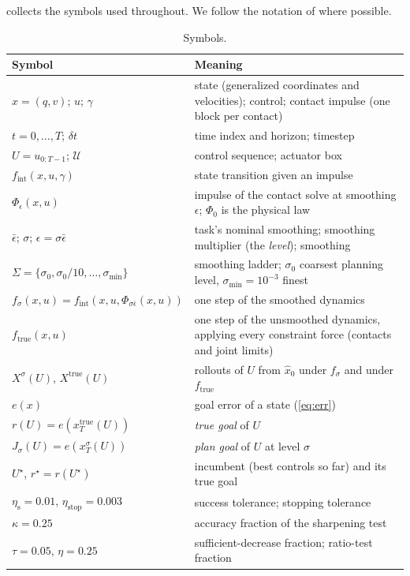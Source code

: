 \documentclass[11pt]{article}
\theoremstyle{remark}
\newcommand{\ftrue}{f_{\mathrm{true}}}
\newcommand{\fint}{f_{\mathrm{int}}}
\newcommand{\epsref}{\bar{\epsilon}}
\newcommand{\etas}{\eta_{\mathrm{s}}}
\newcommand{\etastop}{\eta_{\mathrm{stop}}}
\newcommand{\smin}{\sigma_{\min}}
\newcommand{\U}{\mathcal{U}}
\newcommand{\inc}{U^\star}
\newcommand{\rinc}{r^\star}
\begin{document}
 collects the symbols used throughout. We follow the notation of \cite{li2027lifted} where possible.

\begin{table}[t]
\centering
\caption{Symbols.}
\label{tab:symbols}
\small
\begin{tabularx}{\linewidth}{@{}lX@{}}
\toprule
Symbol & Meaning \\
\midrule
$x = (q, v)$; $u$; $\gamma$ & state (generalized coordinates and velocities); control; contact impulse (one block per contact) \\
$t = 0, \dots, T$; $\delta t$ & time index and horizon; timestep \\
$U = u_{0:T-1}$; $\U$ & control sequence; actuator box \\
$\fint(x, u, \gamma)$ & state transition given an impulse \\
$\Phi_\epsilon(x, u)$ & impulse of the contact solve at smoothing $\epsilon$; $\Phi_0$ is the physical law \\
$\epsref$; $\sigma$; $\epsilon = \sigma\epsref$ & task's nominal smoothing; smoothing multiplier (the \emph{level}); smoothing \\
$\Sigma = \{\sigma_0, \sigma_0/10, \dots, \smin\}$ & smoothing ladder; $\sigma_0$ coarsest planning level, $\smin = 10^{-3}$ finest \\
$f_\sigma(x,u) = \fint(x,u,\Phi_{\sigma\epsref}(x,u))$ & one step of the smoothed dynamics \\
$\ftrue(x, u)$ & one step of the unsmoothed dynamics, applying every constraint force (contacts and joint limits) \\
$X^\sigma(U)$, $X^{\mathrm{true}}(U)$ & rollouts of $U$ from $\hat x_0$ under $f_\sigma$ and under $\ftrue$ \\
$e(x)$ & goal error of a state (\cref{eq:err}) \\
$r(U) = e(x^{\mathrm{true}}_T(U))$ & \emph{true goal} of $U$ \\
$J_\sigma(U) = e(x^\sigma_T(U))$ & \emph{plan goal} of $U$ at level $\sigma$ \\
$\inc$, $\rinc = r(\inc)$ & incumbent (best controls so far) and its true goal \\
$\etas = 0.01$, $\etastop = 0.003$ & success tolerance; stopping tolerance \\
$\kappa = 0.25$ & accuracy fraction of the sharpening test \\
$\tau = 0.05$, $\eta = 0.25$ & sufficient-decrease fraction; ratio-test fraction \\

\end{tabularx}
\end{table}
\end{document}
